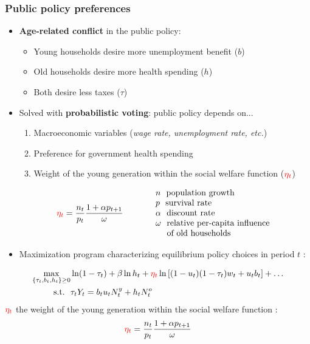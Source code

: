 \documentclass[usenames,dvipsnames]{beamer}
\begin{document}
	\begin{frame}\frametitle{Public policy preferences}
		\begin{itemize}
			\item \textbf{Age-related conflict} in the public policy:
			\begin{itemize}
				\item Young households desire more unemployment benefit ($b$)
				\item Old households desire more health spending ($h$)
				\item Both desire less taxes ($\tau$)
			\end{itemize}
			\vspace{1em}
			\item Solved with \textbf{probabilistic voting}: public policy depends on...
			\begin{enumerate}
				\item Macroeconomic variables (\textit{wage rate, unemployment rate, etc.})
				\item Preference for government health spending
				\item Weight of the young generation within the social welfare function ($\textcolor{red}{\eta_t}$)
			\end{enumerate}
			\vspace{1em}
			\[
			\textcolor{red}{\eta_t} = \frac{n_t}{p_t}\frac{1+\alpha p_{t+1}}{\omega}\  \hspace{3em}
			\begin{array}{l}
			n~~\text{population growth}\\p~~\text{survival rate}\\\alpha~~\text{discount rate}\\\omega~~\text{relative per-capita influence}\\~~~~\text{of old households}
			\end{array}
			\]
		\end{itemize}
	\end{frame}
	\begin{frame}
		\begin{itemize}
			\item Maximization program characterizing equilibrium policy choices in period $t$ :
		\end{itemize}
		\begin{align*}
		\max_{\lbrace\tau_t, b_t, h_t\rbrace\geq 0} &\ln(1-\tau_t) +\beta \ln h_t + \textcolor{red}{\eta_t} \ln\left[(1-u_t)(1-\tau_t)w_t + u_t b_t\right] + \dots\\
		\text{s.t.} ~~ &\tau_t Y_t = b_t u_t N_t^y + h_t N_t^o
		\end{align*}
		$\textcolor{red}{\eta_t}$ the weight of the young generation within the social welfare function :\\
		\begin{equation*}
		\textcolor{red}{\eta_t} = \frac{n_t}{p_t}\frac{1+\alpha p_{t+1}}{\omega}
		\end{equation*}
	\end{frame}
\end{document}
